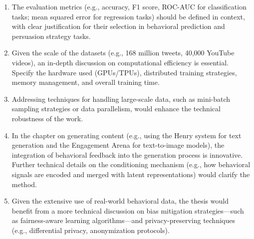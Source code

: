 \begin{enumerate}
\item The evaluation metrics (e.g., accuracy, F1 score, ROC-AUC for classification tasks; mean squared error for regression tasks) should be defined in context, with clear justification for their selection in behavioral prediction and persuasion strategy tasks.


\item Given the scale of the datasets (e.g., 168 million tweets, 40,000 YouTube videos), an in-depth discussion on computational efficiency is essential. Specify the hardware used (GPUs/TPUs), distributed training strategies, memory management, and overall training time.

\item Addressing techniques for handling large-scale data, such as mini-batch sampling strategies or data parallelism, would enhance the technical robustness of the work.


\item In the chapter on generating content (e.g., using the Henry system for text generation and the Engagement Arena for text-to-image models), the integration of behavioral feedback into the generation process is innovative. Further technical details on the conditioning mechanism (e.g., how behavioral signals are encoded and merged with latent representations) would clarify the method.


\item Given the extensive use of real-world behavioral data, the thesis would benefit from a more technical discussion on bias mitigation strategies—such as fairness-aware learning algorithms—and privacy-preserving techniques (e.g., differential privacy, anonymization protocols).
\end{enumerate}

